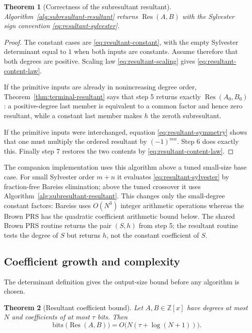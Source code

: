 \documentclass[11pt]{book}
\newtheorem{theorem}{Theorem}[section]
\theoremstyle{definition}
\newcommand{\ZZ}{\mathbb Z}
\newcommand{\bits}{\operatorname{bits}}
\begin{document}
\begin{theorem}[Correctness of the subresultant resultant]
\label{thm:subresultant-resultant-correct}
Algorithm~\ref{alg:subresultant-resultant} returns
$\operatorname{Res}(A,B)$ with the Sylvester sign convention
\eqref{eq:resultant-sylvester}.
\end{theorem}

\begin{proof}
The constant cases are \eqref{eq:resultant-constant}, with the empty
Sylvester determinant equal to $1$ when both inputs are constants.  Assume
therefore that both degrees are positive.  Scaling law
\eqref{eq:resultant-scaling} gives
\eqref{eq:resultant-content-law}.

If the primitive inputs are already in nonincreasing degree order,
Theorem~\ref{thm:terminal-resultant} says that step 5 returns exactly
$\operatorname{Res}(A_0,B_0)$: a positive-degree last member is equivalent to
a common factor and hence zero resultant, while a constant last member makes
$h$ the zeroth subresultant.

If the primitive inputs were interchanged, equation
\eqref{eq:resultant-symmetry} shows that one must multiply the ordered
resultant by $(-1)^{mn}$.  Step 6 does exactly this.  Finally step 7 restores
the two contents by \eqref{eq:resultant-content-law}.
\end{proof}

The companion implementation uses this algorithm above a tuned small-size base
case.  For small Sylvester order $m+n$ it evaluates
\eqref{eq:resultant-sylvester} by fraction-free Bareiss elimination; above the
tuned crossover it uses Algorithm~\ref{alg:subresultant-resultant}.  This
changes only the small-degree constant factors: Bareiss uses $O(N^3)$ integer
arithmetic operations whereas the Brown PRS has the quadratic coefficient
arithmetic bound below.  The shared Brown PRS routine returns the pair $(S,h)$
from step 5; the resultant routine tests the degree of $S$ but returns $h$, not
the constant coefficient of $S$.

\subsection{Coefficient growth and complexity}

The determinant definition gives the output-size bound before any algorithm
is chosen.

\begin{theorem}[Resultant coefficient bound]\label{thm:resultant-size}
Let $A,B\in\ZZ[x]$ have degrees at most $N$ and coefficients of at most
$\tau$ bits.  Then
\begin{equation}\label{eq:resultant-size}
 \bits\bigl(\operatorname{Res}(A,B)\bigr)
 =O\bigl(N(\tau+\log(N+1))\bigr).
\end{equation}
\end{theorem}
\end{document}

